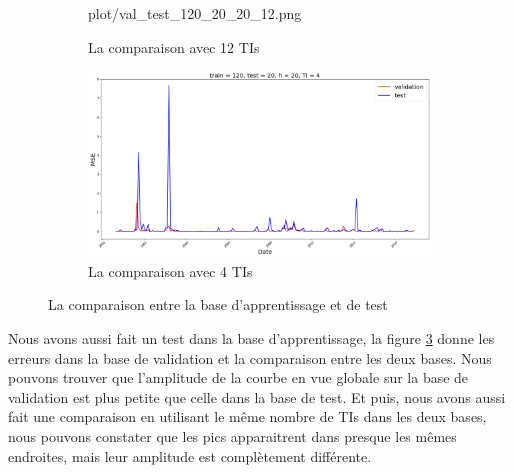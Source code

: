 \begin{figure}[H]
\begin{subfigure}{.5\textwidth}
	{plot/val_test_120_20_20_12.png}
	\caption{La comparaison avec 12 TIs}
	\label{fig:val_test_12}
	\end{subfigure}%
	\begin{subfigure}{.5\textwidth}
	\centering
	\includegraphics[width=.9\linewidth, scale=0.2]
	{plot/val_test_120_20_20_4.png}
	\caption{La comparaison avec 4 TIs}
	\label{fig:val_test_4}
	\end{subfigure}	
\caption{La comparaison entre la base d'apprentissage et de test}
\label{fig:val_test_TI}
\end{figure}

Nous avons aussi fait un test dans la base d'apprentissage, la figure \ref{fig:val_test_TI} donne les erreurs dans la base de validation et la comparaison entre les deux bases. Nous pouvons trouver que l'amplitude de la courbe en vue globale sur la base de validation est plus petite que celle dans la base de test. Et puis, nous avons aussi fait une comparaison en utilisant le même nombre de TIs dans les deux bases, nous pouvons constater que les pics apparaitrent dans presque les mêmes endroites, mais leur amplitude est complètement différente.




